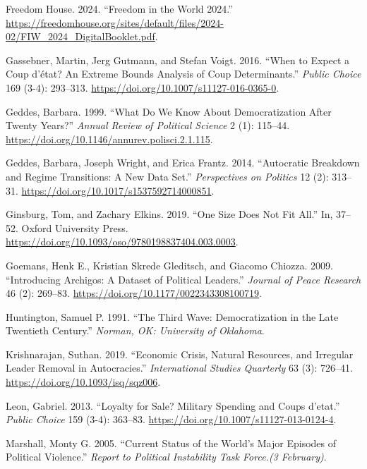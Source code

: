 \documentclass[
  12pt,
]{report}
\newlength{\cslhangindent}
\newenvironment{CSLReferences}[2] %
 {\begin{list}{}{%
  \setlength{\itemindent}{0pt}
  \setlength{\leftmargin}{0pt}
  \setlength{\parsep}{0pt}
  \ifodd #1
   \setlength{\leftmargin}{\cslhangindent}
   \setlength{\itemindent}{-1\cslhangindent}
  \fi
  \setlength{\itemsep}{#2\baselineskip}}}
 {\end{list}}
\begin{document}
\begin{CSLReferences}{1}{0}
Freedom House. 2024. {``Freedom in the World 2024.''}
\url{https://freedomhouse.org/sites/default/files/2024-02/FIW_2024_DigitalBooklet.pdf}.

Gassebner, Martin, Jerg Gutmann, and Stefan Voigt. 2016. {``When to
Expect a Coup d{'}état? An Extreme Bounds Analysis of Coup
Determinants.''} \emph{Public Choice} 169 (3-4): 293--313.
\url{https://doi.org/10.1007/s11127-016-0365-0}.

Geddes, Barbara. 1999. {``What Do We Know About Democratization After
Twenty Years?''} \emph{Annual Review of Political Science} 2 (1):
115--44. \url{https://doi.org/10.1146/annurev.polisci.2.1.115}.

Geddes, Barbara, Joseph Wright, and Erica Frantz. 2014. {``Autocratic
Breakdown and Regime Transitions: A New Data Set.''} \emph{Perspectives
on Politics} 12 (2): 313--31.
\url{https://doi.org/10.1017/s1537592714000851}.

Ginsburg, Tom, and Zachary Elkins. 2019. {``One Size Does Not Fit
All.''} In, 37--52. Oxford University Press.
\url{https://doi.org/10.1093/oso/9780198837404.003.0003}.

Goemans, Henk E., Kristian Skrede Gleditsch, and Giacomo Chiozza. 2009.
{``Introducing Archigos: A Dataset of Political Leaders.''}
\emph{Journal of Peace Research} 46 (2): 269--83.
\url{https://doi.org/10.1177/0022343308100719}.

Huntington, Samuel P. 1991. {``The Third Wave: Democratization in the
Late Twentieth Century.''} \emph{Norman, OK: University of Oklahoma}.

Krishnarajan, Suthan. 2019. {``Economic Crisis, Natural Resources, and
Irregular Leader Removal in Autocracies.''} \emph{International Studies
Quarterly} 63 (3): 726--41. \url{https://doi.org/10.1093/isq/sqz006}.

Leon, Gabriel. 2013. {``Loyalty for Sale? Military Spending and Coups
d{'}etat.''} \emph{Public Choice} 159 (3-4): 363--83.
\url{https://doi.org/10.1007/s11127-013-0124-4}.

Marshall, Monty G. 2005. {``Current Status of the World's Major Episodes
of Political Violence.''} \emph{Report to Political Instability Task
Force.(3 February)}.


\end{CSLReferences}
\end{document}
